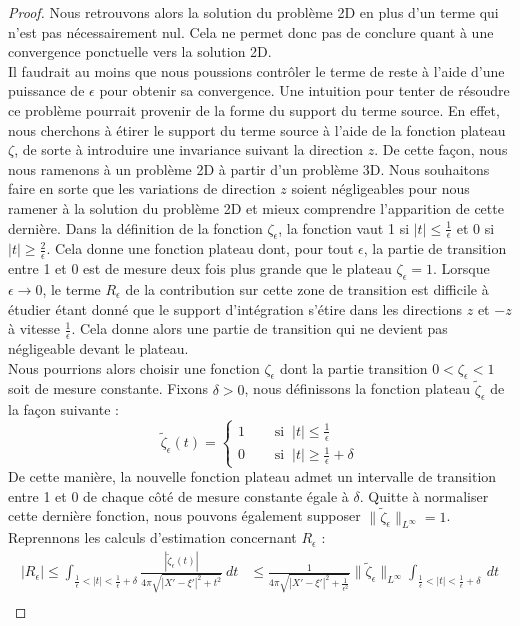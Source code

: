 \begin{proof}
Nous retrouvons alors la solution du problème 2D en plus d'un terme qui n'est pas nécessairement nul.
Cela ne permet donc pas de conclure quant à une convergence ponctuelle vers la solution 2D. \\
Il faudrait au moins que nous poussions contrôler le terme de reste à l'aide d'une puissance de $\epsilon$ pour obtenir sa convergence.
Une intuition pour tenter de résoudre ce problème pourrait provenir de la forme du support du terme source. En effet, nous cherchons à étirer le support du terme source à l'aide de la fonction plateau $\zeta$, de sorte à introduire une invariance suivant la direction $z$. De cette façon, nous nous ramenons à un problème 
2D à partir d'un problème 3D. Nous souhaitons faire en sorte que les variations de direction $z$ soient négligeables pour nous ramener à la solution du problème 2D et mieux comprendre l'apparition de cette dernière. Dans la définition de la fonction $\zeta_{\epsilon}$, la fonction vaut 1 si $|t| \leq \frac{1}{\epsilon}$ et 0 si $|t| \geq \frac{2}{\epsilon}$.
Cela donne une fonction plateau dont, pour tout $\epsilon$, la partie de transition entre 1 et 0 est de mesure deux fois plus grande que le plateau $\zeta_{\epsilon} = 1$. Lorsque $\epsilon \to 0$, le terme $R_{\epsilon}$ de la contribution sur cette zone de transition est difficile à étudier étant donné que le support d'intégration s'étire dans les directions $z$ et $-z$ à vitesse $\frac{1}{\epsilon}$. Cela donne alors une partie de transition qui ne devient pas négligeable devant le plateau. \\
Nous pourrions alors choisir une fonction $\zeta_{\epsilon}$ dont la partie transition $0 < \zeta_{\epsilon} < 1$ soit de mesure constante. Fixons $\delta > 0$, nous définissons la fonction plateau $\tilde{\zeta}_{\epsilon}$ de la façon suivante :
$$ \tilde{\zeta}_{\epsilon}(t) = \begin{cases}
    1 \quad  &\text{ si } \ |t| \leq \frac{1}{\epsilon} \\
    0 &\text{ si } \ |t| \geq \frac{1}{\epsilon} + \delta
\end{cases} $$
De cette manière, la nouvelle fonction plateau admet un intervalle de transition entre 1 et 0 de chaque côté de mesure constante égale à $\delta$. Quitte à normaliser cette dernière fonction, nous pouvons également supposer $\|\tilde{\zeta}_{\epsilon}\|_{L^{\infty}} = 1$.
Reprennons les calculs d'estimation concernant $R_{\epsilon}$ : 
\begin{align*}
    |R_{\epsilon}| \leq \int_{\frac{1}{\epsilon} < |t| < \frac{1}{\epsilon} + \delta } \frac{|\tilde{\zeta}_{\epsilon}(t)|}{4\pi \sqrt{|X' - \xi'|^2 + t^2}} \ dt &\leq \frac{1}{4\pi \sqrt{|X' - \xi'|^2 + \frac{1}{\epsilon^2}}} \| \tilde{\zeta}_{\epsilon} \|_{L^{\infty}} \int_{\frac{1}{\epsilon} < |t| < \frac{1}{\epsilon} + \delta } \ dt \\

\end{align*}
\end{proof}
